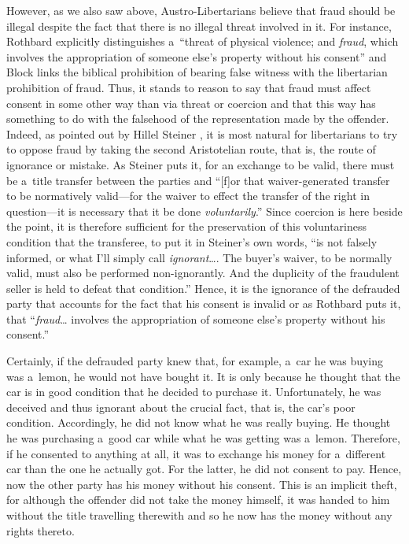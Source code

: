 {However, as we also saw above, Austro-Libertarians believe that fraud should be illegal despite the fact that there is no illegal threat involved in it. For instance, Rothbard 
\parencite*[][p.77]{rothbard_ethics_1998} %
 explicitly distinguishes a~``threat of physical violence; and \textit{fraud}, which involves the appropriation of someone else's property without his consent'' and Block 
\parencite*[][p.38]{} %
 links the biblical prohibition of bearing false witness with the libertarian prohibition of fraud. Thus, it stands to reason to say that fraud must affect consent in some other way than via threat or coercion and that this way has something to do with the falsehood of the representation made by the offender. Indeed, as pointed out by Hillel Steiner 
\parencite*[][p.100]{steiner_asymmetric_2019}, %
 it is most natural for libertarians to try to oppose fraud by taking the second Aristotelian route, that is, the route of ignorance or mistake. As Steiner 
\parencite*[][p.100]{steiner_asymmetric_2019} %
 puts it, for an exchange to be valid, there must be a~title transfer between the parties and ``[f]or that waiver-generated transfer to be normatively valid---for the waiver to effect the transfer of the right in question---it is necessary that it be done \textit{voluntarily}.'' Since coercion is here beside the point, it is therefore sufficient for the preservation of this voluntariness condition that the transferee, to put it in Steiner's 
\parencite*[][p.100]{steiner_asymmetric_2019} %
 own words, ``is not falsely informed, or what I'll simply call \textit{ignorant}…. The buyer's waiver, to be normally valid, must also be performed non-ignorantly. And the duplicity of the fraudulent seller is held to defeat that condition.'' Hence, it is the ignorance of the defrauded party that accounts for the fact that his consent is invalid or as Rothbard 
\parencite*[][p.77]{rothbard_ethics_1998} %
 puts it, that ``\textit{fraud}… involves the appropriation of someone else's property without his consent.''



Certainly, if the defrauded party knew that, for example, a~car he was buying was a~lemon, he would not have bought it. It is only because he thought that the car is in good condition that he decided to purchase it. Unfortunately, he was deceived and thus ignorant about the crucial fact, that is, the car's poor condition. Accordingly, he did not know what he was really buying. He thought he was purchasing a~good car while what he was getting was a~lemon. Therefore, if he consented to anything at all, it was to exchange his money for a~different car than the one he actually got. For the latter, he did not consent to pay. Hence, now the other party has his money without his consent. This is an implicit theft, for although the offender did not take the money himself, it was handed to him without the title travelling therewith and so he now has the money without any rights thereto.



}

